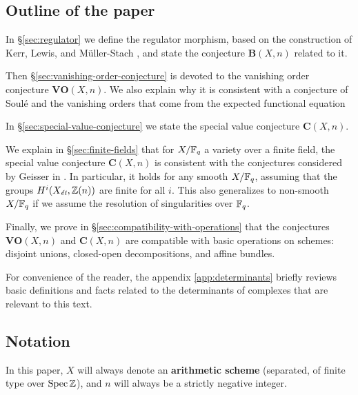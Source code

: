 \documentclass{article}
\numberwithin{equation}{section}
\begin{document}
\subsection*{Outline of the paper}

In \S\ref{sec:regulator} we define the regulator morphism, based on the
construction of Kerr, Lewis, and Müller-Stach
\cite{Kerr-Lewis-Muller-Stach-2006}, and state the conjecture $\mathbf{B} (X,n)$
related to it.

Then \S\ref{sec:vanishing-order-conjecture} is devoted to the vanishing order
conjecture $\mathbf{VO} (X,n)$. We also explain why it is consistent with a
conjecture of Soulé and the vanishing orders that come from the expected
functional equation

In \S\ref{sec:special-value-conjecture} we state the special value conjecture
$\mathbf{C} (X,n)$.

We explain in \S\ref{sec:finite-fields} that for $X/\FF_q$ a variety
over a finite field, the special value conjecture $\mathbf{C} (X,n)$ is
consistent with the conjectures considered by Geisser in
\cite{Geisser-2004,Geisser-2006,Geisser-2010-arithmetic-homology}.
In particular, it holds for any smooth $X/\FF_q$, assuming that the groups
$H^i (X_\et, \ZZ (n))$ are finite for all $i$. This also generalizes to
non-smooth $X/\FF_q$ if we assume the resolution of singularities over $\FF_q$.

Finally, we prove in \S\ref{sec:compatibility-with-operations} that the
conjectures $\mathbf{VO} (X,n)$ and $\mathbf{C} (X,n)$ are compatible with basic
operations on schemes: disjoint unions, closed-open decompositions, and affine
bundles.

For convenience of the reader, the appendix \ref{app:determinants} briefly
reviews basic definitions and facts related to the determinants of complexes
that are relevant to this text.

\subsection*{Notation}

In this paper, $X$ will always denote an \textbf{arithmetic scheme} (separated,
of finite type over $\Spec \ZZ$), and $n$ will always be a strictly negative
integer.
\end{document}

